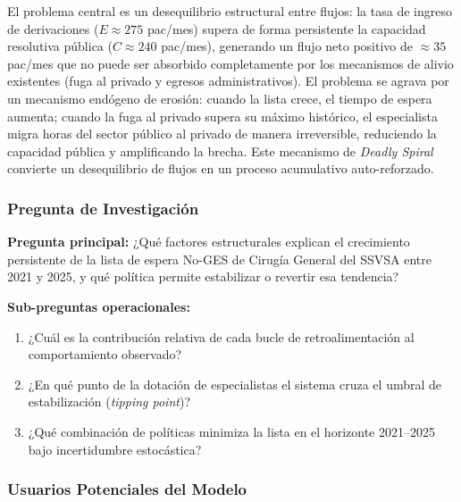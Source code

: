 \documentclass[12pt,a4paper]{article}
\begin{document}
El problema central es un desequilibrio estructural entre flujos: la tasa de ingreso de derivaciones ($E \approx 275$ pac/mes) supera de forma persistente la capacidad resolutiva pública ($C \approx 240$ pac/mes), generando un flujo neto positivo de $\approx 35$ pac/mes que no puede ser absorbido completamente por los mecanismos de alivio existentes (fuga al privado y egresos administrativos). El problema se agrava por un mecanismo endógeno de erosión: cuando la lista crece, el tiempo de espera aumenta; cuando la fuga al privado supera su máximo histórico, el especialista migra horas del sector público al privado de manera irreversible, reduciendo la capacidad pública y amplificando la brecha. Este mecanismo de \textit{Deadly Spiral} convierte un desequilibrio de flujos en un proceso acumulativo auto-reforzado.

\subsubsection*{Pregunta de Investigación}

\begin{tcolorbox}[colback=azulDS!5,colframe=azulDS!60]
  \textbf{Pregunta principal:} ¿Qué factores estructurales explican el crecimiento persistente de la lista de espera No-GES de Cirugía General del SSVSA entre 2021 y 2025, y qué política permite estabilizar o revertir esa tendencia?

  \medskip
  \textbf{Sub-preguntas operacionales:}
  \begin{enumerate}[leftmargin=1.2cm,label=(\roman*)]
    \item ¿Cuál es la contribución relativa de cada bucle de retroalimentación al comportamiento observado?
    \item ¿En qué punto de la dotación de especialistas el sistema cruza el umbral de estabilización (\textit{tipping point})?
    \item ¿Qué combinación de políticas minimiza la lista en el horizonte 2021--2025 bajo incertidumbre estocástica?
  \end{enumerate}
\end{tcolorbox}

\subsubsection*{Usuarios Potenciales del Modelo}
\end{document}
